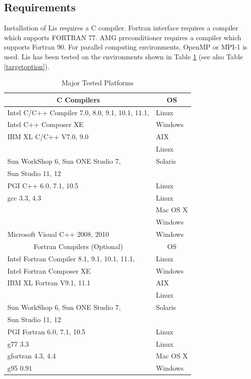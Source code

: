 \documentclass[a4paper]{article}
\begin{document}
 \subsection{Requirements}
Installation of Lis requires a C compiler.
Fortran interface requires a compiler 
which supports FORTRAN 77. AMG preconditioner requires a 
compiler which supports Fortran 90. For parallel computing 
environments, OpenMP or MPI-1 is used.
Lis has been tested on the environments shown in Table \ref{platforms}
(see also Table \ref{targetoption}).

\begin{table}[htbp]
\caption{Major Tested Platforms}
\label{platforms}
\begin{center}
{\small
 \begin{tabular}{l|l}
\hline
\multicolumn{1}{c|}{C Compilers} & \multicolumn{1}{c}{OS} \\
\hline
Intel C/C++ Compiler 7.0, 8.0, 9.1, 10.1, 11.1,  & Linux \\
Intel C++ Composer XE                            & Windows  \\
\hline
IBM XL C/C++ V7.0, 9.0                     & AIX     \\
                                           & Linux   \\
\hline
Sun WorkShop 6, Sun ONE Studio 7,          & Solaris \\
Sun Studio 11, 12                          &         \\
\hline
PGI C++ 6.0, 7.1, 10.5                     & Linux \\
\hline
gcc 3.3, 4.3                               & Linux \\
                                           & Mac OS X \\
                                           & Windows \\
\hline
Microsoft Visual C++ 2008, 2010            & Windows \\
\hline
\hline
\multicolumn{1}{c|}{Fortran Compilers (Optional)} & \multicolumn{1}{c}{OS} \\
\hline
Intel Fortran Compiler 8.1, 9.1, 10.1, 11.1, & Linux \\
Intel Fortran Composer XE                    & Windows  \\
\hline
IBM XL Fortran V9.1, 11.1                  & AIX     \\
                                           & Linux   \\
\hline
Sun WorkShop 6, Sun ONE Studio 7,          & Solaris \\
Sun Studio 11, 12                          &         \\
\hline
PGI Fortran 6.0, 7.1, 10.5                 & Linux \\
\hline
g77 3.3                                    & Linux \\
gfortran 4.3, 4.4                          & Mac OS X \\
g95 0.91                                   & Windows \\
\hline
\end{tabular}
}
\end{center}
\end{table} 
\end{document}
